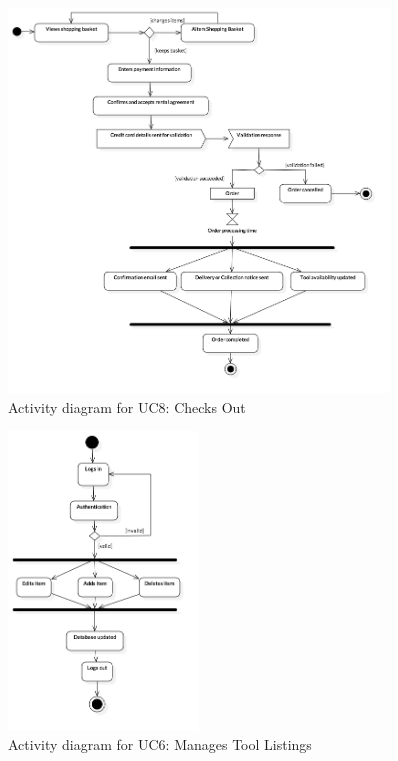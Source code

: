 \documentclass[fontsize=11pt]{extarticle}
\numberwithin{figure}{section} %
\numberwithin{table}{section}%
\begin{document}
\begin{figure}[H]
      \centering
      \includegraphics[trim = 0 0 0 0, clip, width=0.9\textwidth]{TempImg/checkoutAD.png}
      \caption{Activity diagram for UC8: Checks Out}
 \end{figure}

\begin{figure}[H]
      \centering
      \includegraphics[trim = 0 0 0 0, clip, width=0.45\textwidth]{TempImg/manageToolsAD.png}
      \caption{Activity diagram for UC6: Manages Tool Listings}
 \end{figure}
\end{document}
